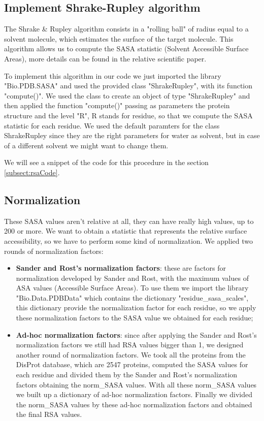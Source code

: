 \subsection{Implement Shrake-Rupley algorithm}
The Shrake \& Rupley algorithm consists in a "rolling ball" of radius equal to a solvent molecule, which estimates the surface of the target molecule.
This algorithm allows us to compute the SASA statistic (Solvent Accessible Surface Areas), more details can be found in the relative scientific paper\cite{ShrakeRupley}.

To implement this algorithm in our code we just imported the library "Bio.PDB.SASA" and used the provided class "ShrakeRupley", with its function "compute()". We used the class to create an object of type "ShrakeRupley" and then applied the function "compute()" passing as parameters the protein structure and the level "R", R stands for residue, so that we compute the SASA statistic for each residue. We used the default paramters for the class ShrakeRupley since they are the right parameters for water as solvent, but in case of a different solvent we might want to change them.

We will see a snippet of the code for this procedure in the section \ref{subsect:rsaCode}.

\subsection{Normalization}

These SASA values aren't relative at all, they can have really high values, up to 200 or more. We want to obtain a statistic that represents the relative surface accessibility, so we have to perform some kind of normalization. We applied two rounds of normalization factors:

\begin{itemize}
    \item \textbf{Sander and Rost's normalization factors}: these are factors for normalization developed by Sander and Rost, with the maximum values of ASA values (Accessible Surface Areas). To use them we import the library "Bio.Data.PDBData" which contains the dictionary "residue\_sasa\_scales", this dictionary provide the normalization factor for each residue, so we apply these normalization factors to the SASA value we obtained for each residue;
    \item \textbf{Ad-hoc normalization factors}: since after applying the Sander and Rost's normalization factors we still had RSA values bigger than 1, we designed another round of normalization factors. We took all the proteins from the DisProt database, which are 2547 proteins, computed the SASA values for each residue and divided them by the Sander and Rost's normalization factors obtaining the norm\_SASA values. With all these norm\_SASA values we built up a dictionary of ad-hoc normalization factors. Finally we divided the norm\_SASA values by these ad-hoc normalization factors and obtained the final RSA values.
\end{itemize}


